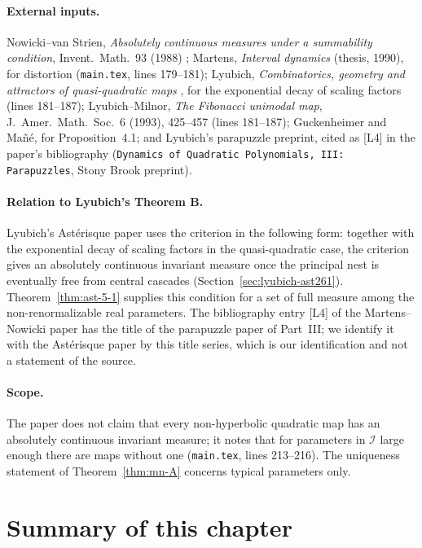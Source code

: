 \paragraph{External inputs.}
Nowicki--van Strien, \emph{Absolutely continuous measures under a summability condition}, Invent.\ Math.\ 93 (1988)
\cite{NowickiVanStrien}; Martens, \emph{Interval dynamics} (thesis, 1990), for distortion (\texttt{main.tex}, lines 179--181);
Lyubich, \emph{Combinatorics, geometry and attractors of quasi-quadratic maps} \cite{LyubichQuasiQuadratic}, for the exponential
decay of scaling factors (lines 181--187); Lyubich--Milnor, \emph{The Fibonacci unimodal map}, J.\ Amer.\ Math.\ Soc.\ 6 (1993),
425--457 (lines 181--187); Guckenheimer and Ma\~n\'e, for Proposition~4.1; and Lyubich's parapuzzle preprint, cited as [L4] in the
paper's bibliography (\texttt{Dynamics of Quadratic Polynomials, III: Parapuzzles}, Stony Brook preprint).

\paragraph{Relation to Lyubich's Theorem B.}
Lyubich's Astérisque paper uses the criterion in the following form: together with the exponential decay of scaling factors
in the quasi-quadratic case, the criterion gives an absolutely continuous invariant measure once the principal nest is eventually
free from central cascades (Section~\ref{sec:lyubich-ast261}).  Theorem~\ref{thm:ast-5-1} supplies this condition for a set of full
measure among the non-renormalizable real parameters.  The bibliography entry [L4] of the Martens--Nowicki paper has the title of
the parapuzzle paper of Part~III; we identify it with the Astérisque paper by this title series, which is our identification and
not a statement of the source.

\paragraph{Scope.}
The paper does not claim that every non-hyperbolic quadratic map has an absolutely continuous invariant measure; it notes that
for parameters in $\mathcal I$ large enough there are maps without one (\texttt{main.tex}, lines 213--216).  The uniqueness statement
of Theorem~\ref{thm:mn-A} concerns typical parameters only.

\section{Summary of this chapter}
\label{sec:digests-iv-summary}

